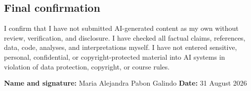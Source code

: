 \documentclass[11pt]{article}
\begin{document}
\bigskip

\subsection*{Final confirmation}

\noindent
I confirm that I have not submitted AI-generated content as my own without review,
verification, and disclosure. I have checked all factual claims, references, data,
code, analyses, and interpretations myself. I have not entered sensitive,
personal, confidential, or copyright-protected material into AI systems in
violation of data protection, copyright, or course rules.

\bigskip
\bigskip

\noindent
\textbf{Name and signature:} Maria Alejandra Pabon Galindo
\hfill
\textbf{Date:} 31 August 2026
\end{document}
